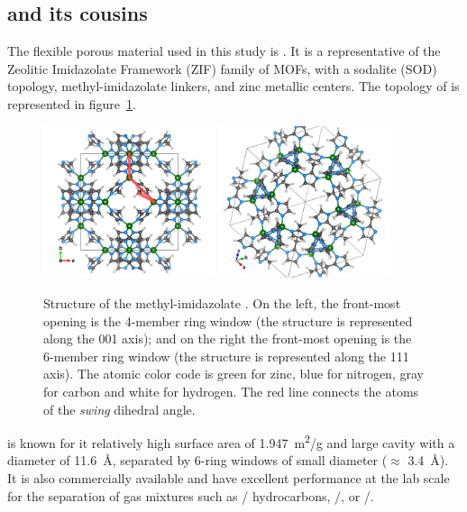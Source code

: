 \documentclass[thesis]{subfiles}
\begin{document}
\subsection{ and its cousins}

The flexible porous material used in this study is . It is a representative
of the Zeolitic Imidazolate Framework (ZIF) family of MOFs, with a sodalite
(SOD) topology, methyl-imidazolate linkers, and zinc metallic centers. The
topology of  is represented in figure~\ref{fig:zif8-ch3:structure}.

\begin{figure}[ht]
    \centering
    \includegraphics[width=0.45\textwidth]{figures/images/swing-angle}
    \hfill
    \includegraphics[width=0.45\textwidth]{figures/images/ZIF8-111}
    \caption{Structure of the methyl-imidazolate . On the left, the
    front-most opening is the 4-member ring window (the structure is represented
    along the 001 axis); and on the right the front-most opening is the 6-member
    ring window (the structure is represented along the 111 axis). The atomic
    color code is green for zinc, blue for nitrogen, gray for carbon and white
    for hydrogen. The red line connects the atoms of the \emph{swing}
     dihedral angle.}
    \label{fig:zif8-ch3:structure}
\end{figure}

 is known for it relatively high surface area of \SI{1.947}{m^2/g} and
large cavity with a diameter of \SI{11.6}{\AA}\cite{Park2006}, separated by
6-ring windows of small diameter ($\approx$ \SI{3.4}{\AA}). It is also
commercially available and have excellent performance at the lab scale for the
separation of gas mixtures such as / hydrocarbons,
/, or /\cite{Li2009, Bux2011}.
\end{document}
